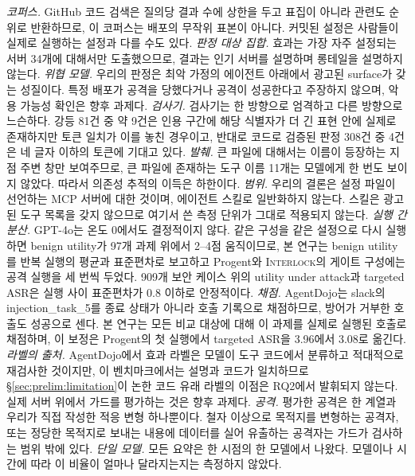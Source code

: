 \documentclass[acmsmall,screen,review,anonymous]{acmart}
\begin{document}
\emph{코퍼스.} GitHub 코드 검색은 질의당 결과 수에 상한을 두고 표집이 아니라 관련도 순위로 반환하므로, 이 코퍼스는 배포의 무작위 표본이 아니다. 커밋된 설정은 사람들이 실제로 실행하는 설정과 다를 수도 있다. \emph{판정 대상 집합.} 효과는 가장 자주 설정되는 서버 34개에 대해서만 도출했으므로, 결과는 인기 서버를 설명하며 롱테일을 설명하지 않는다. \emph{위협 모델.} 우리의 판정은 최악 가정의 에이전트 아래에서 광고된 surface가 갖는 성질이다. 특정 배포가 공격을 당했다거나 공격이 성공한다고 주장하지 않으며, 악용 가능성 확인은 향후 과제다. \emph{검사기.} 검사기는 한 방향으로 엄격하고 다른 방향으로 느슨하다. 강등 81건 중 약 9건은 인용 구간에 해당 식별자가 더 긴 표현 안에 실제로 존재하지만 토큰 일치가 이를 놓친 경우이고, 반대로 코드로 검증된 판정 308건 중 4건은 네 글자 이하의 토큰에 기대고 있다. \emph{발췌.} 큰 파일에 대해서는 이름이 등장하는 지점 주변 창만 보여주므로, 큰 파일에 존재하는 도구 이름 11개는 모델에게 한 번도 보이지 않았다. 따라서 의존성 추적의 이득은 하한이다. \emph{범위.} 우리의 결론은 설정 파일이 선언하는 MCP 서버에 대한 것이며, 에이전트 스킬로 일반화하지 않는다. 스킬은 광고된 도구 목록을 갖지 않으므로 여기서 쓴 측정 단위가 그대로 적용되지 않는다. \emph{실행 간 분산.} GPT-4o는 온도 0에서도 결정적이지 않다. 같은 구성을 같은 설정으로 다시 실행하면 benign utility가 97개 과제 위에서 2--4점 움직이므로, 본 연구는 benign utility를 반복 실행의 평균과 표준편차로 보고하고 Progent와 \textsc{Interlock}의 게이트 구성에는 공격 실행을 세 번씩 두었다. 909개 보안 케이스 위의 utility under attack과 targeted ASR은 실행 사이 표준편차가 0.8 이하로 안정적이다. \emph{채점.} AgentDojo는 slack의 injection\_task\_5를 종료 상태가 아니라 호출 기록으로 채점하므로, 방어가 거부한 호출도 성공으로 센다. 본 연구는 모든 비교 대상에 대해 이 과제를 실제로 실행된 호출로 채점하며, 이 보정은 Progent의 첫 실행에서 targeted ASR을 3.96에서 3.08로 옮긴다. \emph{라벨의 출처.} AgentDojo에서 효과 라벨은 모델이 도구 코드에서 분류하고 적대적으로 재검사한 것이지만, 이 벤치마크에서는 설명과 코드가 일치하므로 \S\ref{sec:prelim:limitation}이 논한 코드 유래 라벨의 이점은 RQ2에서 발휘되지 않는다. 실제 서버 위에서 가드를 평가하는 것은 향후 과제다. \emph{공격.} 평가한 공격은 한 계열과 우리가 직접 작성한 적응 변형 하나뿐이다. 철자 이상으로 목적지를 변형하는 공격자, 또는 정당한 목적지로 보내는 내용에 데이터를 실어 유출하는 공격자는 가드가 검사하는 범위 밖에 있다. \emph{단일 모델.} 모든 요약은 한 시점의 한 모델에서 나왔다. 모델이나 시간에 따라 이 비율이 얼마나 달라지는지는 측정하지 않았다.
\end{document}

